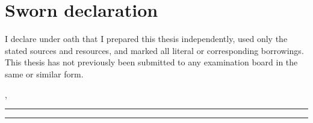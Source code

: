 \chapter*{Sworn declaration}

\pagestyle{plain}

I declare under oath that I prepared this thesis independently, used only the stated sources and resources, and marked all literal or corresponding borrowings. This thesis has not previously been submitted to any examination board in the same or similar form.

\vfill

\vspace*{\baselineskip}
\noindent \begin{minipage}{\textwidth}
	\noindent \begin{minipage}{0.49\textwidth}
		\begin{flushleft}
			, \rule{3cm}{0.5pt}
		\end{flushleft}
	\end{minipage} \hfill
	\begin{minipage}{0.49\textwidth}
		\begin{flushright}
			\rule{4cm}{0.5pt}
		\end{flushright}
	\end{minipage}
\end{minipage}

\newpage

